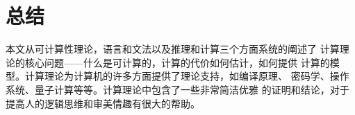 \chapter*{总结}
本文从可计算性理论，语言和文法以及推理和计算三个方面系统的阐述了
计算理论的核心问题——什么是可计算的，计算的代价如何估计，如何提供
计算的模型。计算理论为计算机的许多方面提供了理论支持，如编译原理、
密码学、操作系统、量子计算等等。计算理论中包含了一些非常简洁优雅
的证明和结论，对于提高人的逻辑思维和审美情趣有很大的帮助。

